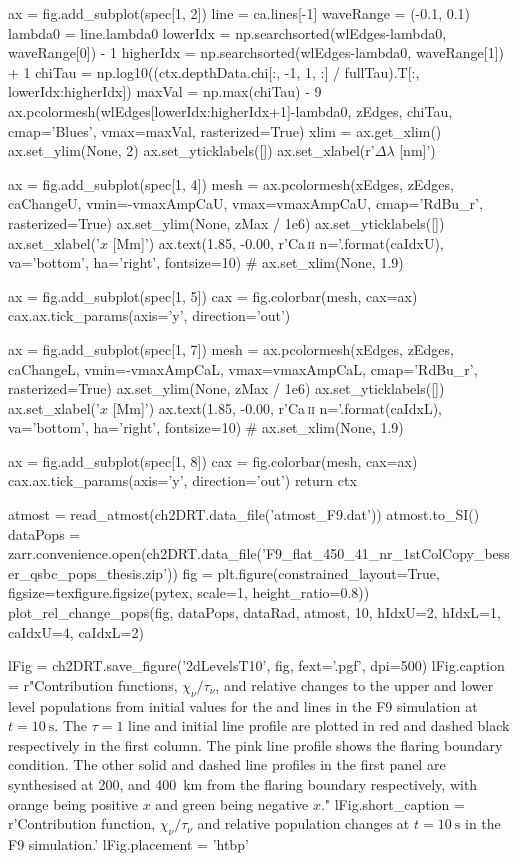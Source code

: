 \begin{pycode}[2DRT]
    ax = fig.add_subplot(spec[1, 2])
    line = ca.lines[-1]
    waveRange = (-0.1, 0.1)
    lambda0 = line.lambda0
    lowerIdx = np.searchsorted(wlEdges-lambda0, waveRange[0]) - 1
    higherIdx = np.searchsorted(wlEdges-lambda0, waveRange[1]) + 1
    chiTau = np.log10((ctx.depthData.chi[:, -1, 1, :] / fullTau).T[:, lowerIdx:higherIdx])
    maxVal = np.max(chiTau) - 9
    ax.pcolormesh(wlEdges[lowerIdx:higherIdx+1]-lambda0, zEdges,
                  chiTau,
                  cmap='Blues', vmax=maxVal, rasterized=True)
    xlim = ax.get_xlim()
    ax.set_ylim(None, 2)
    ax.set_yticklabels([])
    ax.set_xlabel(r'$\Delta\lambda$ [nm]')

    ax = fig.add_subplot(spec[1, 4])
    mesh = ax.pcolormesh(xEdges, zEdges, caChangeU, vmin=-vmaxAmpCaU, vmax=vmaxAmpCaU,
                         cmap='RdBu_r', rasterized=True)
    ax.set_ylim(None, zMax / 1e6)
    ax.set_yticklabels([])
    ax.set_xlabel('$x$ [Mm]')
    ax.text(1.85, -0.00, r'Ca\,\textsc{{ii}} n={}'.format(caIdxU), va='bottom', ha='right', fontsize=10)
    # ax.set_xlim(None, 1.9)

    ax = fig.add_subplot(spec[1, 5])
    cax = fig.colorbar(mesh, cax=ax)
    cax.ax.tick_params(axis='y', direction='out')

    ax = fig.add_subplot(spec[1, 7])
    mesh = ax.pcolormesh(xEdges, zEdges, caChangeL, vmin=-vmaxAmpCaL, vmax=vmaxAmpCaL,
                         cmap='RdBu_r', rasterized=True)
    ax.set_ylim(None, zMax / 1e6)
    ax.set_yticklabels([])
    ax.set_xlabel('$x$ [Mm]')
    ax.text(1.85, -0.00, r'Ca\,\textsc{{ii}} n={}'.format(caIdxL), va='bottom', ha='right', fontsize=10)
    # ax.set_xlim(None, 1.9)

    ax = fig.add_subplot(spec[1, 8])
    cax = fig.colorbar(mesh, cax=ax)
    cax.ax.tick_params(axis='y', direction='out')
    return ctx


atmost = read_atmost(ch2DRT.data_file('atmost_F9.dat'))
atmost.to_SI()
dataPops = zarr.convenience.open(ch2DRT.data_file('F9_flat_450_41_nr_1stColCopy_besser_qsbc_pops_thesis.zip'))
fig = plt.figure(constrained_layout=True, figsize=texfigure.figsize(pytex, scale=1, height_ratio=0.8))
plot_rel_change_pops(fig, dataPops, dataRad, atmost, 10, hIdxU=2, hIdxL=1, caIdxU=4, caIdxL=2)

lFig = ch2DRT.save_figure('2dLevelsT10', fig, fext='.pgf', dpi=500)
lFig.caption = r"Contribution functions, $\chi_\nu/\tau_\nu$, and relative changes to the upper and lower level populations from initial values for the \Ha{} and \CaLine{} lines in the F9 simulation at $t=\SI{10}{\second}$. The $\tau=1$ line and initial line profile are plotted in red and dashed black respectively in the first column. The pink line profile shows the flaring boundary condition. The other solid and dashed line profiles in the first panel are synthesised at 200, and \SI{400}{\kilo\metre} from the flaring boundary respectively, with orange being positive $x$ and green being negative $x$."
lFig.short_caption = r'Contribution function, $\chi_\nu/\tau_\nu$ and relative population changes at $t=\SI{10}{\second}$ in the F9 simulation.'
lFig.placement = 'htbp'


\end{pycode}
